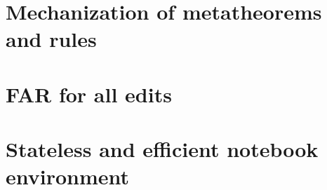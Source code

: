 \section{Mechanization of metatheorems and rules}
\label{sec:formalization}

\section{FAR for all edits}
\label{sec:far_all_edits}


\section{Stateless and efficient notebook environment}
\label{sec:notebook_ui_future}


